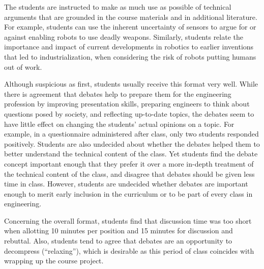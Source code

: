 The students are instructed to make as much use as possible of technical arguments that are grounded in the course materials and in additional literature. For example, students can use the inherent uncertainty of sensors to argue for or against enabling robots to use deadly weapons. Similarly, students relate the importance and impact of current developments in robotics to earlier inventions that led to industrialization, when considering the risk of robots putting humans out of work.

Although suspicious as first, students usually receive this format very well.  While there is agreement that debates help to prepare them for the engineering profession by improving presentation skills, preparing engineers to think about questions posed by society, and reflecting up-to-date topics, the debates seem to have little effect on changing the students' actual opinions on a topic. For example, in a questionnaire administered after class, only two students responded positively. Students are also undecided about whether the debates helped them to better understand the technical content of the class. Yet students find the debate concept important enough that they prefer it over a more in-depth treatment of the technical content of the class, and disagree that debates should be given less time in class. However, students are undecided whether debates are important enough to merit early inclusion in the curriculum or to be part of every class in engineering.

Concerning the overall format, students find that discussion time was too short when allotting 10 minutes per position and 15 minutes for discussion and rebuttal. Also, students tend to agree that debates are an opportunity to decompress (``relaxing''), which is desirable as this period of class coincides with wrapping up the course project.
